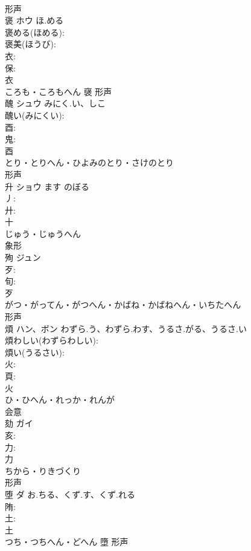 \documentclass[8pt]{extreport}
\begin{document}
\begin{CJK}{UTF8}{min}
\\	形声 
\\	褒	ホウ	ほ.める		
\\	褒める(ほめる): 
\\	褒美(ほうび): 
\\	衣: 
\\	保: 
\\	衣	
\\	ころも・ころもへん	襃	形声 
\\	醜	シュウ	みにく.い、しこ		
\\	醜い(みにくい): 
\\	酉: 
\\	鬼: 
\\	酉	
\\	とり・とりへん・ひよみのとり・さけのとり	
\\	形声 
\\	升	ショウ	ます	のぼる	
\\	丿: 
\\	廾: 
\\	十	
\\	じゅう・じゅうへん	
\\	象形 
\\	殉	ジュン			
\\	歹: 
\\	旬: 
\\	歹	
\\	がつ・がってん・がつへん・かばね・かばねへん・いちたへん	
\\	形声 
\\	煩	ハン、ボン	わずら.う、わずら.わす、うるさ.がる、うるさ.い		
\\	煩わしい(わずらわしい): 
\\	煩い(うるさい): 
\\	火: 
\\	頁: 
\\	火	
\\	ひ・ひへん・れっか・れんが	
\\	会意 
\\	劾	ガイ			
\\	亥: 
\\	力: 
\\	力	
\\	ちから・りきづくり	
\\	形声 
\\	堕	ダ	お.ちる、くず.す、くず.れる		
\\	陏: 
\\	土: 
\\	土	
\\	つち・つちへん・どへん	墮	形声 

\end{CJK}
\end{document}
